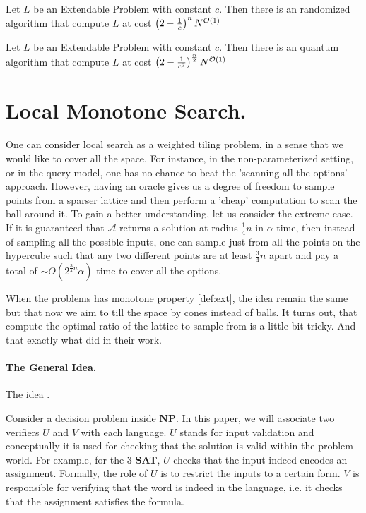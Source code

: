 \documentclass[manuscript,screen,review]{acmart}
\begin{document}
\begin{theorem} 
	\label{thm:classic}
  Let $L$ be an Extendable Problem with constant $c$. Then there is an randomized algorithm that compute $L$ at cost $ \left(2-\frac{1}{c}\right)^{ n }N^{{\mathcal{O}}(1)}$
\end{theorem}

\begin{theorem} 
	\label{thm:quantum}
  Let $L$ be an Extendable Problem with constant $c$. Then there is an quantum algorithm that compute $L$ at cost $ \left(2-\frac{1}{c^{2}}\right)^{ \frac{n}{2} }N^{{\mathcal{O}}(1)}$
\end{theorem}
\section{ Local Monotone Search. }
One can consider local search as a weighted tiling problem, in a sense that we would like to cover all the space. For instance, in the non-parameterized setting, or in the query model, one has no chance to beat the 'scanning all the options' approach. However, having an oracle gives us a degree of freedom to sample points from a sparser lattice and then perform a 'cheap' computation to scan the ball around it. To gain a better understanding, let us consider the extreme case. If it is guaranteed that $\mathcal{A}$ returns a solution at radius $\frac{1}{4}n$ in $\alpha$ time, then instead of sampling all the possible inputs, one can sample just from all the points on the hypercube such that any two different points are at least $\frac{3}{4}n$ apart and pay a total of $\sim O\left( 2^{\frac{3}{4}n} \alpha \right)$ time to cover all the options.

When the problems has monotone property \cref{def:ext}, the idea remain the same but that now we aim to till the space by cones instead of balls. It turns out, that compute the optimal ratio of the lattice to sample from is a little bit tricky. And that exactly what \cite{fomin2015exact} did in their work.   

\paragraph{The General Idea.} The idea   . 

Consider a decision problem inside \textbf{NP}. In this paper, we will associate two verifiers $U$ and $V$ with each language. $U$ stands for input validation and conceptually it is used for checking that the solution is valid within the problem world. For example, for the $3$-\textbf{SAT}, $U$ checks that the input indeed encodes an assignment. Formally, the role of $U$ is to restrict the inputs to a certain form. $V$ is responsible for verifying that the word is indeed in the language, i.e. it checks that the assignment satisfies the formula.
\end{document}
